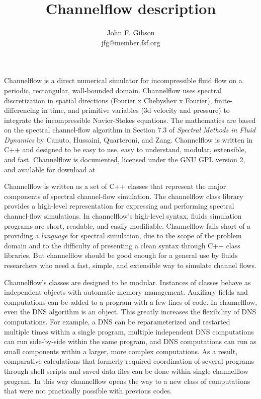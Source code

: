 \documentclass{article}[12pt]
\begin{document}
\renewcommand{\arraystretch}{1.5}

\title{Channelflow description}
\author{John F. Gibson\\jfg@member.fsf.org}
\maketitle

\thispagestyle{empty}
\indent


Channelflow is a direct numerical simulator for incompressible fluid
flow on a periodic, rectangular, wall-bounded domain. Channelflow uses
spectral discretization in spatial directions (Fourier x Chebyshev x
Fourier), finite-differencing in time, and primitive variables (3d
velocity and pressure) to integrate the incompressible Navier-Stokes
equations. The mathematics are based on the spectral channel-flow
algorithm in Section 7.3 of {\em Spectral Methods in Fluid Dynamics}
by Canuto, Hussaini, Quarteroni, and Zang. Channelflow is written in
C++ and designed to be easy to use, easy to understand, modular,
extensible, and fast. Channelflow is documented, licensed under the
GNU GPL version 2, and available for download at

Channelflow is written as a set of C++ classes that represent the
major components of spectral channel-flow simulation. The channelflow
class library provides a high-level representation for expressing and
performing spectral channel-flow simulations. In channelflow's
high-level syntax, fluids simulation programs are short, readable, and
easily modifiable. Channelflow falls short of a providing a {\em
language} for spectral simulation, due to the scope of the problem
domain and to the difficulty of presenting a clean syntax through C++
class libraries. But channelflow should be good enough for a general 
use by fluids researchers who need a fast, simple, and extensible way 
to simulate channel flows.

Channelflow's classes are designed to be modular. Instances of classes
behave as independent objects with automatic memory management. 
Auxiliary fields and computations can be added to a program with a few
lines of code. In channelflow, even the DNS algorithm is an object. 
This greatly increases the flexibility of DNS computations. For
example, a DNS can be reparameterized and restarted multiple times
within a single program, multiple independent DNS computations can run
side-by-side within the same program, and DNS computations can run as
small components within a larger, more complex computations. As a
result, comparative calculations that formerly required coordination 
of several programs through shell scripts and saved data files can
be done within single channelflow program. In this way channelflow 
opens the way to a new class of computations that were not practically 
possible with previous codes.
\end{document}
